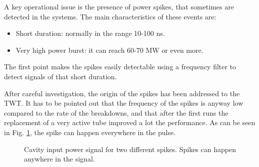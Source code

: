 A key operational issue is the presence of power spikes, that sometimes are detected in the systems. The main characteristics of these events are:
\begin{itemize}
\item Short duration: normally in the range 10-100 ns.
\item Very high power burst: it can reach 60-70 MW or even more.
\end{itemize}
The first point makes the spikes easily detectable using a frequency filter to detect signals of that short duration. 

 After careful investigation, the origin of the spikes has been addressed to the TWT. It has to be pointed out that the frequency of the spikes is anyway low compared to the rate of the breakdowns, and that after the first runs the replacement of a very active tube improved a lot the performance. As can be seen in Fig. \ref{spikesAndDetuning}, the spike can happen everywhere in the pulse.

 \begin{figure}[h]
 \centering
 \hspace{2mm}
 \caption{Cavity input power signal for two different spikes. Spikes can happen anywhere in the signal.}
 \label{spikesAndDetuning}
 \end{figure}

